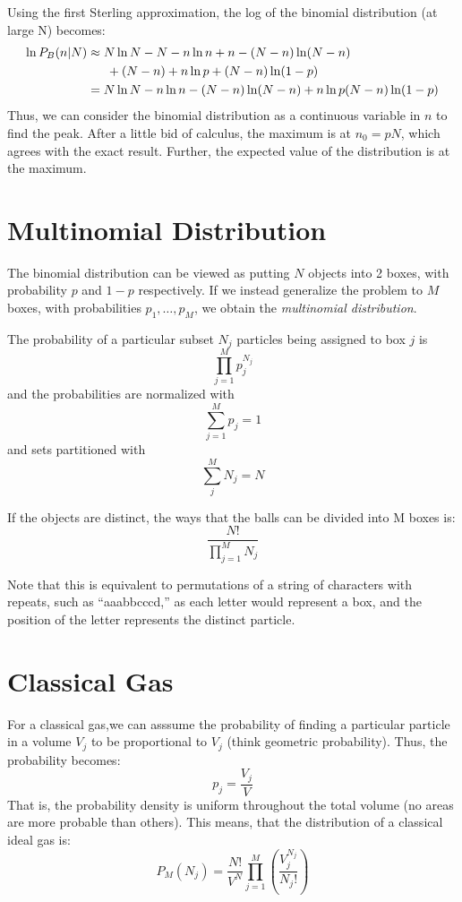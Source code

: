 Using the first Sterling approximation, the log of the binomial distribution (at large N) becomes:
\begin{align}
	\ln P_B(n|N)&\approx N\ln N - N - n\ln n + n -(N-n)\ln(N-n)\nonumber\\ &\hphantom{==}+(N-n) +n\ln p + (N-n)\ln(1-p)\nonumber\\
		    &=N\ln N - n\ln n -(N-n)\ln(N-n) + n\ln p (N-n)\ln(1-p)
\end{align}
Thus, we can consider the binomial distribution as a continuous variable in \(n\) to find the peak. After a little bid of calculus, the maximum is at \(n_0=pN\), which agrees with the exact result. Further, the expected value of the distribution is at the maximum.

\section{Multinomial Distribution}
The binomial distribution can be viewed as putting \(N\) objects into 2 boxes, with probability \(p\) and \(1-p\) respectively. If we instead generalize the problem to \(M\) boxes, with probabilities \(p_1,\ldots,p_M\), we obtain the \emph{multinomial distribution}.

The probability of a particular subset \(N_j\) particles being assigned to box \(j\) is
\begin{equation}
	\prod_{j=1}^M p_j^{N_j}
\end{equation}
and the probabilities are normalized with
\begin{equation}
	\sum_{j=1}^M p_j=1
\end{equation}
and sets partitioned with 
\begin{equation}
	\sum_j^M N_j=N
\end{equation}

If the objects are distinct, the ways that the balls can be divided into M boxes is:
\begin{equation}
	\frac{N!}{\prod_{j=1}^M N_j}
\end{equation}

Note that this is equivalent to permutations of a string of characters with repeats, such as ``aaabbcccd,'' as each letter would represent a box, and the position of the letter represents the distinct particle.

\section{Classical Gas}
For a classical gas,we can asssume the probability of finding a particular particle in a volume \(V_j\) to be proportional to \(V_j\) (think geometric probability). Thus, the probability becomes:
\begin{equation}
	p_j=\frac{V_j}{V}
\end{equation}
That is, the probability density is uniform throughout the total volume (no areas are more probable than others). This means, that the distribution of a classical ideal gas is:
\begin{equation}
	P_M({N_j}) = \frac{N!}{V^N}\prod_{j=1}^M\left(\frac{V_j^{N_j}}{N_j!}\right)
\end{equation}

